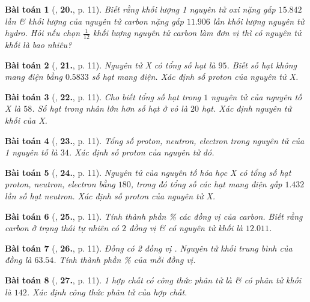 \documentclass{article}
\numberwithin{equation}{section}
\newtheorem{baitoan}{Bài toán}[section]
\begin{document}
\begin{baitoan}[\cite{An2011}, \textbf{20.}, p. 11]
	Biết rằng khối lượng 1 nguyên tử oxi nặng gấp $15.842$ lần \& khối lượng của nguyên tử carbon nặng gấp $11.906$ lần khối lượng nguyên tử hydro. Hỏi nếu chọn $\frac{1}{12}$ khối lượng nguyên tử carbon làm đơn vị thì  có nguyên tử khối là bao nhiêu?
\end{baitoan}

\begin{baitoan}[\cite{An2011}, \textbf{21.}, p. 11]
	Nguyên tử X có tổng số hạt là $95$. Biết số hạt không mang điện bằng $0.5833$ số hạt mang điện. Xác định số proton của nguyên tử X.
\end{baitoan}

\begin{baitoan}[\cite{An2011}, \textbf{22.}, p. 11]
	Cho biết tổng số hạt trong $1$ nguyên tử của nguyên tố X là $58$. Số hạt trong nhân lớn hơn số hạt ở vỏ là $20$ hạt. Xác định nguyên tử khối của X.
\end{baitoan}

\begin{baitoan}[\cite{An2011}, \textbf{23.}, p. 11]
	Tổng số proton, neutron, electron trong nguyên tử của 1 nguyên tố là $34$. Xác định số proton của nguyên tử đó.
\end{baitoan}

\begin{baitoan}[\cite{An2011}, \textbf{24.}, p. 11]
	Nguyên tử của nguyên tố hóa học X có tổng số hạt proton, neutron, electron bằng $180$, trong đó tổng số các hạt mang điện gấp $1.432$ lần số hạt neutron. Xác định số proton của nguyên tử X.
\end{baitoan}

\begin{baitoan}[\cite{An2011}, \textbf{25.}, p. 11]
	Tính thành phần \% các đồng vị của carbon. Biết rằng carbon ở trạng thái tự nhiên có $2$ đồng vị  \&  có nguyên tử khối là $12.011$.
\end{baitoan}

\begin{baitoan}[\cite{An2011}, \textbf{26.}, p. 11]
	Đồng có 2 đồng vị . Nguyên tử khối trung bình của đồng là $63.54$. Tính thành phần \% của mỗi đồng vị.
\end{baitoan}

\begin{baitoan}[\cite{An2011}, \textbf{27.}, p. 11]
	1 hợp chất có công thức phân tử là  \& có phân tử khối là $142$. Xác định công thức phân tử của hợp chất.
\end{baitoan}
\end{document}
